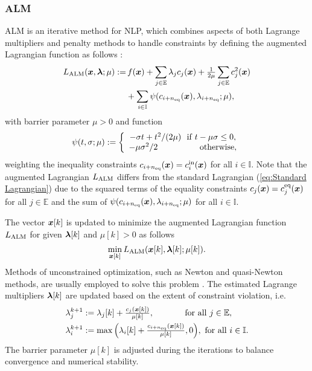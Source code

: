 \documentclass[journal]{IEEEtranTIE}
\begin{document}
\subsubsection{ALM}
ALM is an iterative method for NLP, which combines aspects of both Lagrange multipliers and penalty methods to handle constraints by defining the augmented Lagrangian function as follows \cite{jorge2006numerical}:
\begin{align}
\begin{split}\label{eq:ALM}
L_{\rm ALM}(\mv{x},\mv{\lambda};\mu) :=&\, f(\mv{x}) + \sum\limits_{j \in \mathbb{E}} {{\lambda _j}{c_j}(\mv{x})}  + \tfrac{1}{{2\mu }}\sum\limits_{j \in \mathbb{E}} {c_j^2(\mv{x})} \\
&+ \sum\limits_{i \in \mathbb{I}} \psi(c_{i+n_{\rm eq}}(\mv{x}),\lambda_{i+n_{\rm eq}};\mu),
\end{split}
\end{align}
%
with barrier parameter $\mu>0$ and function
%
\begin{align}
\psi (t,\sigma;\mu) := \left\{ {\begin{array}{*{20}{c}}
{ - \sigma t + {t^2}/(2\mu)\,\,\,\,{\rm{if}}\;t - \mu \sigma \le 0,}\\
{ - \mu{\sigma^2}/2\;\;\;\;\;\;\;\;\;\;\;\;\;\;\;\;\;\;{\rm{otherwise}}{\rm{,}}}
\end{array}} \right.
\end{align}
%
weighting the inequality constraints $c_{i+n_{\rm eq}}(\boldsymbol{x}) = c^{\rm in}_i(\boldsymbol{x})$ for all $i \in \mathbb{I}$.
Note that the augmented Lagrangian $L_{\rm ALM}$ differs from the standard Lagrangian (\ref{eq:Standard Lagrangian}) due to the squared terms of the equality constraints $c_j(\boldsymbol{x}) = c^{\rm eq}_j(\boldsymbol{x})$ for all $j \in \mathbb{E}$ and the sum of $\psi(c_{i+n_{\rm eq}}(\boldsymbol{x}),\lambda_{i+n_{\rm eq}};\mu)$ for all $i \in \mathbb{I}$.

The vector $\boldsymbol{x}[k]$ is updated to minimize the augmented Lagrangian function ${L_{\rm ALM}}$ for given $\boldsymbol{\lambda}[k]$ and $\mu[k]>0$ as follows
\begin{align}\label{eq:min_La}
\mathop {\min }\limits_{\mv{x}[k]} {L_{\rm ALM}}(\mv{x}[k],\mv{\lambda}[k];{\mu[k]}).
\end{align}
Methods of unconstrained optimization, such as Newton and quasi-Newton methods, are usually employed to solve this problem \cite{srivastava2020nesterov}. The estimated Lagrange multipliers $\boldsymbol{\lambda}[k]$ are updated based on the extent of constraint violation, i.e.
%
\begin{subequations}\label{eq:ALM_update}
\begin{align}
\lambda_j^{k + 1} &:= \lambda_j[k] + \tfrac{c_j(\boldsymbol{x}[k])}{\mu[k]},\ \ \ \ \ \ \ \ \ \ \ {\rm{for\ all\ }} j \in \mathbb{E},\\
\lambda_i^{k + 1} &:= \max \Big(\lambda_i[k] + \tfrac{c_{i+n_{\rm eq}}(\boldsymbol{x}[k])}{\mu[k]},0\Big),\ {\rm{for\ all\ }} i \in \mathbb{I}.
\end{align}
\end{subequations}
%
The barrier parameter $\mu[k]$ is adjusted during the iterations to balance convergence and numerical stability. 
\end{document}
